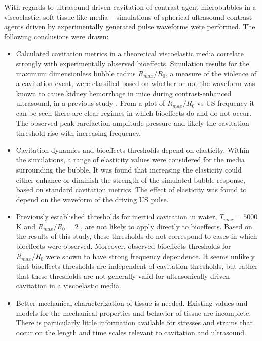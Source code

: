 With regards to ultrasound-driven cavitation of contrast agent
microbubbles in a viscoelastic, soft tissue-like media -- simulations
of spherical ultrasound contrast agents driven by experimentally
generated pulse waveforms were performed. The following conclusions
were drawn:
\begin{itemize}
\item Calculated cavitation metrics in a theoretical viscoelastic
  media correlate strongly with experimentally observed
  bioeffects. Simulation results for the maximum dimensionless bubble
  radius $R_{max}/R_0$, a measure of the violence of a cavitation
  event, were classified based on whether or not the waveform was
  known to cause kidney hemorrhage in mice during contrast-enhanced
  ultrasound, in a previous study \citep{Miller2008}. From a plot of
  $R_{max}/R_0$ vs \ac{US} frequency it can be seen there are clear
  regimes in which bioeffects do and do not occur. The observed peak
  rarefaction amplitude pressure and likely the cavitation threshold
  rise with increasing frequency.
\item Cavitation dynamics and bioeffects thresholds depend on
  elasticity. Within the simulations, a range of elasticity values
  were considered for the media surrounding the bubble. It was found
  that increasing the elasticity could either enhance or diminish the
  strength of the simulated bubble response, based on standard
  cavitation metrics. The effect of elasticity was found to depend on
  the waveform of the driving \ac{US} pulse.
\item Previously established thresholds for inertial cavitation in
  water, $T_{max} = 5000$ K and $R_{max}/R_0 = 2$
  \citep{Apfel1991,Yang2005}, are not likely to apply directly to
  bioeffects. Based on the results of this study, these thresholds do
  not correspond to cases in which bioeffects were observed. Moreover,
  observed bioeffects thresholds for $R_{max}/R_0$ were shown to have
  strong frequency dependence. It seems unlikely that bioeffects
  thresholds are independent of cavitation thresholds, but rather that
  these thresholds are not generally valid for ultrasonically driven
  cavitation in a viscoelastic media.
\item Better mechanical characterization of tissue is needed. Existing
  values and models for the mechanical properties and behavior of
  tissue are incomplete. There is particularly little information
  available for stresses and strains that occur on the length and time
  scales relevant to cavitation and ultrasound.
\end{itemize}

